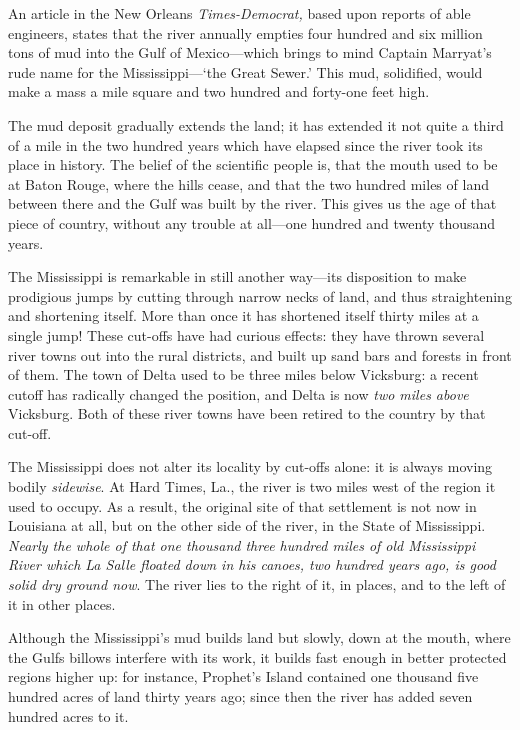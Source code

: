 \documentclass[../demo.tex]{novelette-subdoc}
\begin{document}
An article in the New Orleans \textit{Times-Democrat,}  based upon reports of
able engineers, states that the river annually empties four hundred and
six million tons of mud into the Gulf of Mexico---which brings to mind
Captain Marryat's rude name for the Mississippi---`the Great Sewer.' This
mud, solidified, would make a mass a mile square and two hundred and
forty-one feet high.

The mud deposit gradually extends the land; it has
extended it not quite a third of a mile in the two hundred years which
have elapsed since the river took its place in history. The belief of
the scientific people is, that the mouth used to be at Baton Rouge,
where the hills cease, and that the two hundred miles of land between
there and the Gulf was built by the river. This gives us the age of that
piece of country, without any trouble at all---one hundred and twenty
thousand years.

The Mississippi is remarkable in still another way---its disposition to
make prodigious jumps by cutting through narrow necks of land, and thus
straightening and shortening itself. More than once it has shortened
itself thirty miles at a single jump! These cut-offs have had curious
effects: they have thrown several river towns out into the rural
districts, and built up sand bars and forests in front of them. The town
of Delta used to be three miles below Vicksburg: a recent cutoff has
radically changed the position, and Delta is now \textit{two miles above}
Vicksburg. Both of these river towns have been retired to the country by that
cut-off.

The Mississippi does not alter its locality by cut-offs alone: it
is always moving bodily \textit{sidewise}. At Hard Times, La., the river is two
miles west of the region it used to occupy. As a result, the original site of
that settlement is not now in Louisiana at all, but on the other side of
the river, in the State of Mississippi. \textit{Nearly the whole of that one
thousand three hundred miles of old Mississippi River which La Salle
floated down in his canoes, two hundred years ago, is good solid dry
ground now}. The river lies to the right of it, in places, and to the
left of it in other places.

Although the Mississippi's mud builds land but slowly, down at the
mouth, where the Gulfs billows interfere with its work, it builds fast
enough in better protected regions higher up: for instance, Prophet's
Island contained one thousand five hundred acres of land thirty years
ago; since then the river has added seven hundred acres to it.
\end{document}
